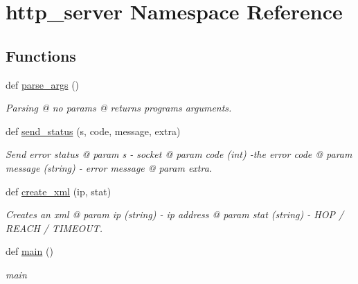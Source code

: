 \hypertarget{namespacehttp__server}{}\section{http\+\_\+server Namespace Reference}
\label{namespacehttp__server}
\subsection*{Functions}
\begin{DoxyCompactItemize}
\item 
def \hyperlink{namespacehttp__server_a504a6ea54432b1a915324279e012f416}{parse\+\_\+args} ()
\begin{DoxyCompactList}\small\item\em Parsing @ no params @ returns program\textquotesingle{}s arguments. \end{DoxyCompactList}\item 
def \hyperlink{namespacehttp__server_a477ea01afb21d25af42c1a2d0c3b3e9d}{send\+\_\+status} (s, code, message, extra)
\begin{DoxyCompactList}\small\item\em Send error status @ param s -\/ socket @ param code (int) -\/the error code @ param message (string) -\/ error message @ param extra. \end{DoxyCompactList}\item 
\mbox{\label{namespacehttp__server_a1281909ae0f12350125c19f28fbd66ac}} 
def \hyperlink{namespacehttp__server_a1281909ae0f12350125c19f28fbd66ac}{create\+\_\+xml} (ip, stat)
\begin{DoxyCompactList}\small\item\em Creates an xml @ param ip (string) -\/ ip address @ param stat (string) -\/ H\+OP / R\+E\+A\+CH / T\+I\+M\+E\+O\+UT. \end{DoxyCompactList}\item 
\mbox{\label{namespacehttp__server_a4672a5721848848d06fd17bde5388c17}} 
def \hyperlink{namespacehttp__server_a4672a5721848848d06fd17bde5388c17}{main} ()
\begin{DoxyCompactList}\small\item\em main \end{DoxyCompactList}\end{DoxyCompactItemize}
